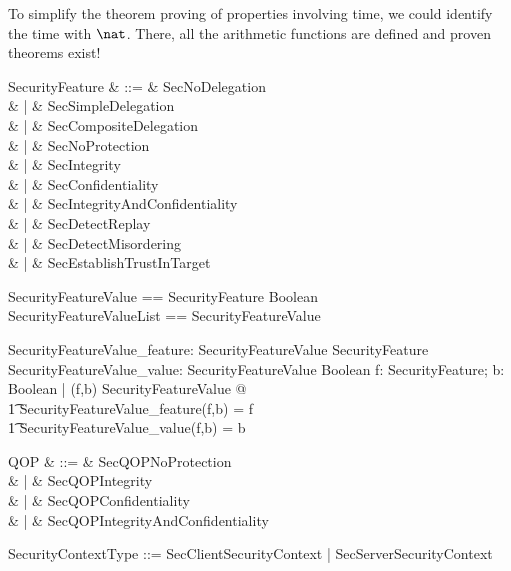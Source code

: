 To simplify the theorem proving of properties involving time, we could identify
the time with $\nat$.  There, all the arithmetic functions are defined and
proven theorems exist!
   
\begin{zed}
\end{zed}
\begin{syntax}
   SecurityFeature & ::= & SecNoDelegation\\
  & | & SecSimpleDelegation\\
  & | & SecCompositeDelegation\\
  & | & SecNoProtection\\
  & | & SecIntegrity\\
  & | & SecConfidentiality\\
  & | & SecIntegrityAndConfidentiality\\
  & | & SecDetectReplay\\
  & | & SecDetectMisordering\\
  & | & SecEstablishTrustInTarget
\end{syntax}
 
\begin{zed}
  SecurityFeatureValue == SecurityFeature \cross Boolean \\
  SecurityFeatureValueList == \seq SecurityFeatureValue
\end{zed}
\begin{axdef}
  SecurityFeatureValue\_feature: SecurityFeatureValue \fun SecurityFeature\\
  SecurityFeatureValue\_value: SecurityFeatureValue \fun Boolean
  \where
  \forall f: SecurityFeature; b: Boolean | (f,b) \in SecurityFeatureValue @ \\
  \t1 SecurityFeatureValue\_feature(f,b) = f \\
  \t1 \land SecurityFeatureValue\_value(f,b) = b
\end{axdef}
\begin{syntax}
  QOP & ::= & SecQOPNoProtection\\
  & | & SecQOPIntegrity\\
  & | & SecQOPConfidentiality\\
  & | & SecQOPIntegrityAndConfidentiality
\end{syntax}
\begin{syntax}
   SecurityContextType ::= SecClientSecurityContext | SecServerSecurityContext
\end{syntax}
